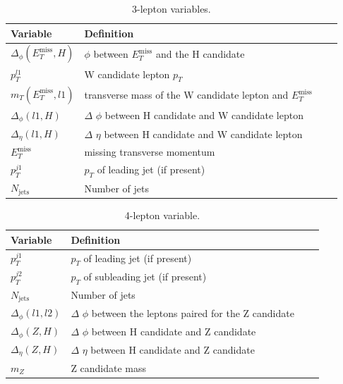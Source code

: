 \begin{table}[htp]
\begin{center}
\begin{tabular}{l l l l}
\toprule
Variable & Definition \\
\midrule
 $\Delta_\phi(E_T^\text{miss},H)$ & $\phi$ between $E_T^\text{miss}$ and the H candidate \\
 $p_T^{l1}$ & W candidate lepton $p_T$ \\
 $m_T(E_T^\text{miss},l1)$ & transverse mass of the W candidate lepton and $E_T^\text{miss}$  \\
 $\Delta_\phi(l1,H)$ & $\Delta$ $\phi$ between H candidate and W candidate lepton \\
 $\Delta_\eta(l1,H)$ & $\Delta$ $\eta$ between H candidate and W candidate lepton \\
 $E_T^\text{miss}$ & missing transverse momentum \\
 $p_T^{j1}$ & $p_T$ of leading jet (if present) \\
 $N_\text{jets}$ & Number of jets \\
\bottomrule
\end{tabular}
\caption{3-lepton variables.}
\label{tab:hmm3lepVars}
\end{center}
\end{table}

\begin{table}[htp]
\begin{center}
\begin{tabular}{l l l l}
\toprule
Variable & Definition \\
\midrule
 $p_T^{j1}$ & $p_T$ of leading jet (if present) \\
 $p_T^{j2}$ & $p_T$ of subleading jet (if present) \\
 $N_\text{jets}$ & Number of jets \\
 $\Delta_\phi(l1,l2)$ & $\Delta$ $\phi$ between the leptons paired for the Z candidate \\
 $\Delta_\phi(Z,H)$ & $\Delta$ $\phi$ between H candidate and Z candidate \\
 $\Delta_\eta(Z,H)$ & $\Delta$ $\eta$ between H candidate and Z candidate \\
 $m_Z$ & Z candidate mass \\
\bottomrule
\end{tabular}
\caption{4-lepton variable.}
\label{tab:hmm4lepVars}
\end{center}
\end{table}

